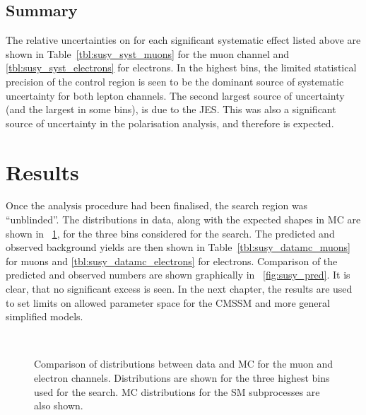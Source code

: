 \subsection{Summary}
The relative uncertainties on \RCS for each significant systematic effect listed
above are shown in Table~\ref{tbl:susy_syst_muons} for the muon channel and
\ref{tbl:susy_syst_electrons} for electrons. In the highest \STlep bins, the
limited statistical precision of the control region is seen to be the dominant
source of systematic uncertainty for both lepton channels. The second largest
source of uncertainty (and the largest in some bins), is due to the
\ac{JES}. This was also a significant source of uncertainty in the \PW
polarisation analysis, and therefore is expected.




\section{Results}
Once the analysis procedure had been finalised, the search region was
``unblinded''. The \LP distributions in data, along with the expected shapes in
\ac{MC} are shown in \fig~\ref{fig:susy_datamc}, for the three \STlep bins
considered for the search. The predicted and observed background yields are then
shown in Table~\ref{tbl:susy_datamc_muons} for muons and
\ref{tbl:susy_datamc_electrons} for electrons. Comparison of the predicted and
observed numbers are shown graphically in \fig~\ref{fig:susy_pred}. It is clear,
that no significant excess is seen. In the next chapter, the results are used to
set limits on allowed parameter space for the \ac{CMSSM} and more general
simplified models.

\begin{figure}[h!]
  \centering {}\quad
  \quad
  \\
  \quad
  \quad
  \caption[Comparison of \LP distributions between data and \ac{MC}]{Comparison
    of \LP distributions between data and \ac{MC} for the muon and electron
    channels. Distributions are shown for the three highest \STlep bins used for
    the search. \ac{MC} distributions for the \ac{SM} subprocesses are also
    shown.}
\label{fig:susy_datamc}
\end{figure}

